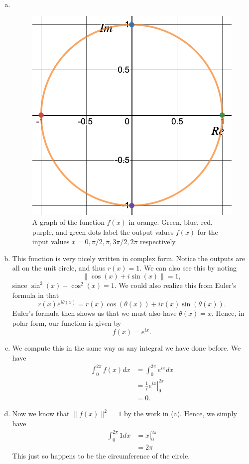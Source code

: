 \documentclass[12pt]{article} %
\begin{document}
\begin{solution}~
	\begin{enumerate}[(a)]
		\item ~
		\begin{figure}[H]
			\centering
			\includegraphics[width=.5\textwidth]{circle_parameterization.png}
			\caption{A graph of the function $f(x)$ in orange. Green, blue, red, purple, and green dots label the output values $f(x)$ for the input values $x=0,\pi/2,\pi,3\pi/2,2\pi$ respectively.}
		\end{figure}
		\item This function is very nicely written in complex form.  Notice the outputs are all on the unit circle, and thus $r(x)=1$.  We can also see this by noting 
		\[
		\|\cos(x)+i\sin(x)\|=1,
		\]
		since $\sin^2(x)+\cos^2(x)=1$.  We could also realize this from Euler's formula in that
		\[
		r(x)e^{i\theta(x)}=r(x)\cos(\theta(x))+ir(x)\sin(\theta(x)).
		\]
		Euler's formula then shows us that we must also have $\theta(x)=x$. Hence, in polar form, our function is given by
		\[
		f(x)=e^{ix}.
		\]
		\item We compute this in the same way as any integral we have done before. We have
		\begin{align*}
			\int_0^{2\pi} f(x) dx &= \int_0^{2\pi} e^{ix}dx\\
			&= \left. \frac{1}{i} e^{ix} \right\vert_0^{2\pi}\\
			&= 0.
		\end{align*}
		\item Now we know that $\|f(x)\|^2=1$ by the work in (a). Hence, we simply have
		\begin{align*}
			\int_0^{2\pi} 1 dx &= x\vert_0^{2\pi}\\
			&= 2\pi
		\end{align*}
		This just so happens to be the circumference of the circle.  
	\end{enumerate}
\end{solution}
\end{document}
